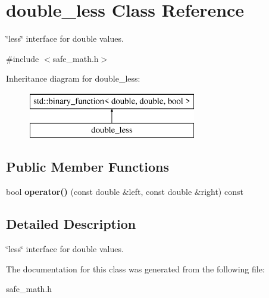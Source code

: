\section{double\+\_\+less Class Reference}
\label{classdouble__less}


\char`\"{}less\char`\"{} interface for double values.  




{\ttfamily \#include $<$safe\+\_\+math.\+h$>$}

Inheritance diagram for double\+\_\+less\+:\begin{figure}[H]
\begin{center}
\leavevmode
\includegraphics[height=2.000000cm]{classdouble__less}
\end{center}
\end{figure}
\subsection*{Public Member Functions}
\begin{DoxyCompactItemize}
\item 
bool {\bfseries operator()} (const double \&left, const double \&right) const 
\end{DoxyCompactItemize}


\subsection{Detailed Description}
\char`\"{}less\char`\"{} interface for double values. 

The documentation for this class was generated from the following file\+:\begin{DoxyCompactItemize}
\item 
safe\+\_\+math.\+h\end{DoxyCompactItemize}
